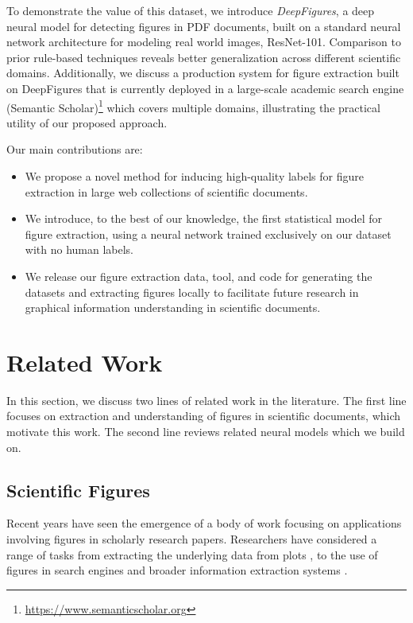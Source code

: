 \documentclass[sigconf]{acmart}
\begin{document}
To demonstrate the value of this dataset, we introduce \emph{DeepFigures}, a deep neural model for detecting figures in PDF documents, built on a standard neural network architecture for modeling real world images, ResNet-101.
Comparison to prior rule-based techniques reveals better generalization across different scientific domains. 
Additionally, we discuss a production system for figure extraction built on DeepFigures that is currently deployed in a large-scale academic search engine (Semantic Scholar)\footnote{\url{https://www.semanticscholar.org}} which covers multiple domains, illustrating the practical utility of our proposed approach.

Our main contributions are:
\begin{itemize}
\item We propose a novel method for inducing high-quality labels for figure extraction in large web collections of scientific documents.
\item We introduce, to the best of our knowledge, the first statistical model for figure extraction, using a neural network trained exclusively on our dataset with no human labels.
\item We release our figure extraction data, tool, and code for generating the datasets and extracting figures locally to facilitate future research in graphical information understanding in scientific documents.
\end{itemize}
\section{Related Work}\label{related_work}
In this section, we discuss two lines of related work in the literature. 
The first line focuses on extraction and understanding of figures in scientific documents, which motivate this work.
The second line reviews related neural models which we build on.
\subsection{Scientific Figures}

Recent years have seen the emergence of a body of work focusing on applications involving  figures in scholarly research papers. 
Researchers have considered a range of tasks from extracting the underlying data from plots \cite{choudhury2015line,figureseer}, to the use of figures in search engines and broader information extraction systems \cite{Choudhury2013AFS,Tsutsui2016AnalyzingFO,Wu2015PDFMEFAM}. 
\end{document}
